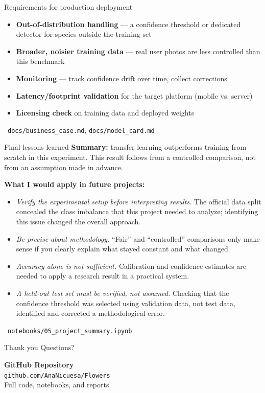 \documentclass[aspectratio=169]{beamer}
\begin{document}
\begin{frame}{Requirements for production deployment}
\begin{itemize}
  \item \textbf{Out-of-distribution handling} — a confidence threshold or
    dedicated detector for species outside the training set
  \item \textbf{Broader, noisier training data} — real user photos are
    less controlled than this benchmark
  \item \textbf{Monitoring} — track confidence drift over time, collect
    corrections
  \item \textbf{Latency/footprint validation} for the target platform
    (mobile vs. server)
  \item \textbf{Licensing check} on training data and deployed weights
\end{itemize}

\vspace{0.05em}
{\scriptsize\color{black!55}\textrightarrow\ \texttt{docs/business\_case.md}, \texttt{docs/model\_card.md}}
\end{frame}

\begin{frame}{Final lessons learned}
\footnotesize
\textbf{Summary:} transfer learning outperforms training from scratch in
this experiment. This result follows from a controlled comparison, not
from an assumption made in advance.

\vspace{0.4em}
\textbf{What I would apply in future projects:}
\begin{itemize}
  \setlength{\itemsep}{1pt}
  \item \emph{Verify the experimental setup before interpreting results.}
    The official data split concealed the class imbalance that this
    project needed to analyze; identifying this issue changed the overall
    approach.
  \item \emph{Be precise about methodology.} ``Fair'' and ``controlled''
    comparisons only make sense if you clearly explain what stayed
    constant and what changed.
  \item \emph{Accuracy alone is not sufficient.} Calibration and
    confidence estimates are needed to apply a research result in a
    practical system.
  \item \emph{A held-out test set must be verified, not assumed.} Checking
    that the confidence threshold was selected using validation data, not
    test data, identified and corrected a methodological error.
\end{itemize}

{\scriptsize\color{black!55}\textrightarrow\ \texttt{notebooks/05\_project\_summary.ipynb}}
\end{frame}

\begin{frame}{Thank you}
\centering
\Large Questions?

\vspace{2em}
\normalsize
\textbf{GitHub Repository}\\[4pt]
\texttt{github.com/AnaNicuesa/Flowers}\\[4pt]
{\small Full code, notebooks, and reports}
\end{frame}
\end{document}
